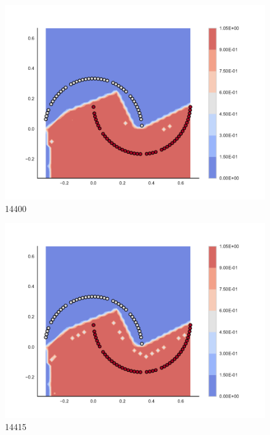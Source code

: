 \begin{subfigure}[b]{0.09\textwidth}
    \includegraphics[clip, trim=2.35cm 1.75cm 4.5cm 0cm,width=\textwidth]{img/convergence/14400.pdf}
    \caption{14400}
    \label{fig:convergence_14400}
\end{subfigure}
%
\begin{subfigure}[b]{0.09\textwidth}
    \includegraphics[clip, trim=2.35cm 1.75cm 4.5cm 0cm,width=\textwidth]{img/convergence/14415.pdf}
    \caption{14415}
    \label{fig:convergence_14415}
\end{subfigure}
%
